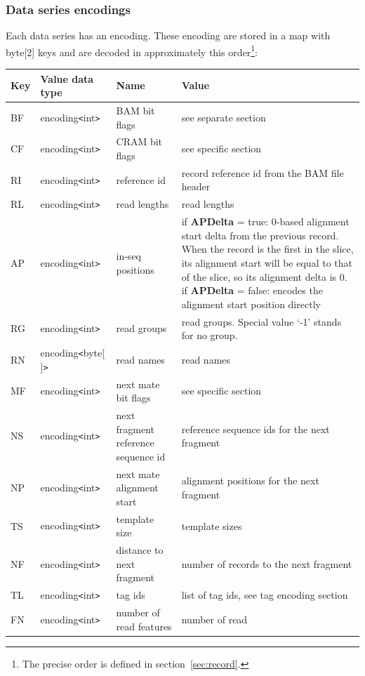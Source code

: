 \documentclass[a4paper]{article}
\begin{document}
\subsubsection*{Data series encodings}

Each data series has an encoding. These encoding are stored in a map with byte[2] 
keys and are decoded in approximately this order\footnote{The precise order is defined in section~\ref{sec:record}.}:

\begin{threeparttable}[t]
\begin{tabular}{|l|l|>{\raggedright}p{100pt}|>{\raggedright}p{220pt}|}
\hline
\textbf{Key} & \textbf{Value data type} & \textbf{Name} & \textbf{Value}\tabularnewline
\hline
BF & encoding\texttt{<}int\texttt{>} & BAM bit flags & see separate section\tabularnewline
\hline
CF & encoding\texttt{<}int\texttt{>} & CRAM bit flags & see specific section\tabularnewline
\hline
RI & encoding\texttt{<}int\texttt{>} & reference id & record reference id from
the BAM file header\tabularnewline
\hline
RL & encoding\texttt{<}int\texttt{>} & read lengths & read lengths\tabularnewline
\hline
AP & encoding\texttt{<}int\texttt{>} & in-seq positions & if \textbf{APDelta} = true: 0-based alignment start
delta from the previous record.  When the record is the first in the slice,
its alignment start will be equal to that of the slice, so its alignment delta is 0.\linebreak{}
if \textbf{APDelta} = false: encodes the alignment start position directly\tabularnewline
\hline
RG & encoding\texttt{<}int\texttt{>} & read groups & read groups. Special value 
`-1' stands for no group.\tabularnewline
\hline
RN\tnote{a} & encoding\texttt{<}byte[ ]\texttt{>} & read names & read names\tabularnewline
\hline
MF & encoding\texttt{<}int\texttt{>} & next mate bit flags & see specific section\tabularnewline
\hline
NS & encoding\texttt{<}int\texttt{>} & next fragment reference sequence id & reference 
sequence ids for the next fragment \tabularnewline
\hline
NP & encoding\texttt{<}int\texttt{>} & next mate alignment start & alignment positions 
for the next fragment\tabularnewline
\hline
TS & encoding\texttt{<}int\texttt{>} & template size & template sizes\tabularnewline
\hline
NF & encoding\texttt{<}int\texttt{>} & distance to next fragment & number of records
to the next fragment\tnote{b}\tabularnewline
\hline
TL\tnote{c} & encoding\texttt{<}int\texttt{>} & tag ids  & list of tag ids, see tag encoding
section\tabularnewline
\hline
FN & encoding\texttt{<}int\texttt{>} & number of read features & number of read

\end{tabular}
\end{threeparttable}
\end{document}
